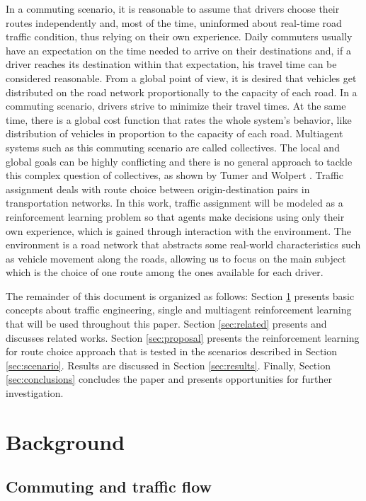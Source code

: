 \documentclass{RITA}
\begin{document}
In a commuting scenario, it is reasonable to assume that drivers choose their routes independently and, most of the time, uninformed about real-time road traffic condition, thus relying on their own experience. Daily commuters usually have an expectation on the time needed to arrive on their destinations and, if a driver reaches its destination within that expectation, his travel time can be considered  reasonable. From a global point of view, it is desired that vehicles get distributed on the road network proportionally to the capacity of each road. In a commuting scenario, drivers strive to minimize their travel times. At the same time, there is a global cost function that rates the whole system's behavior, like distribution of vehicles in proportion to the capacity of each road. Multiagent systems such as this commuting scenario are called collectives. The local and global goals can be highly conflicting and there is no general approach to tackle this complex question of collectives, as shown by Tumer and Wolpert \cite{Tumer&Wolpert2004}.
Traffic assignment deals with route choice between origin-destination pairs in transportation networks. In this work, traffic assignment will be modeled as a reinforcement learning problem so that agents make decisions using only their own experience, which is gained through interaction with the environment. The environment is a road network that abstracts some real-world characteristics such as vehicle movement along the roads, allowing us to focus on the main subject which is the choice of one route among the ones available for each driver.

The remainder of this document is organized as follows: Section \ref{sec:concepts} presents basic concepts about traffic engineering, single and multiagent reinforcement learning that will be used throughout this paper. Section \ref{sec:related} presents and discusses related works. Section \ref{sec:proposal} presents the reinforcement learning for route choice approach that is tested in the scenarios described in Section \ref{sec:scenario}. Results are discussed in Section \ref{sec:results}. Finally, Section \ref{sec:conclusions} concludes the paper and presents opportunities for further investigation.

\section{Background}
\label{sec:concepts}
\subsection{Commuting and traffic flow}
\end{document}

